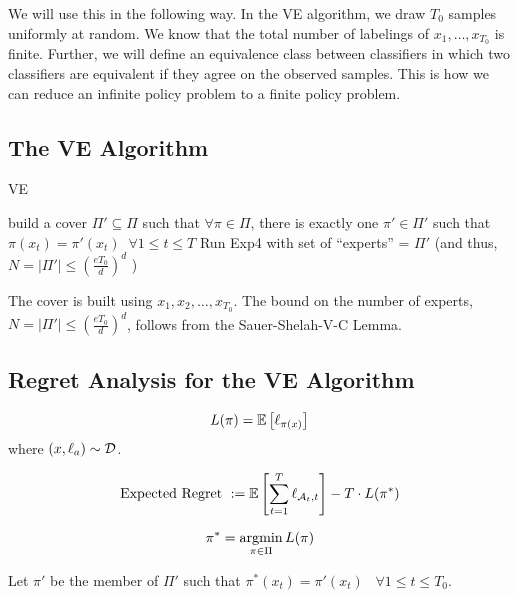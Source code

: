 \documentclass[11pt]{article}
\begin{document}
We will use this in the following way. In the VE algorithm, we draw $T_0$ samples uniformly at random. We know that the total number of labelings of $x_1,\ldots,x_{T_0}$ is finite. Further, we will define an equivalence class between classifiers in which two classifiers are equivalent if they agree on the observed samples. This is how we can reduce an infinite policy problem to a finite policy problem. 


\subsection{The VE Algorithm}

\begin{algorithm}
\caption{VE}
\label{alg: VE}
\begin{algorithmic}
\ENDFOR
\STATE build a cover  $\Pi' \subseteq \Pi$ such that $\forall \pi \in \Pi$, there is exactly one $\pi' \in \Pi'$ such that $\pi(x_t) = \pi'(x_t)\;\;\forall 1 \le t \le T$
\STATE Run Exp4 with set of ``experts'' = $\Pi'$ (and thus,  $N = |\Pi'| \le (\frac{eT_0}{d})^d$ )
\ENDFOR
\end{algorithmic}
\end{algorithm}
The cover is built using $x_1,x_2,\ldots,x_{T_0}$. The bound on the number of experts, $N= |\Pi'| \le (\frac{eT_0}{d})^d$, follows from the Sauer-Shelah-V-C Lemma. 

%
%
\subsection{Regret Analysis for the VE Algorithm}
\begin{equation}
L(\pi) = \mathbb{E}\left[ \ell_{\pi(x)} \right]
\end{equation}
where ${(x,\ell_a)\sim \mathcal{D}}$.

\begin{equation}
\text{Expected Regret }:= \mathbb{E}\left[ \sum_{t=1}^T\ell_{\mathcal{A}_t,t} \right] - T\cdot L(\pi^*)
\end{equation}

$$\pi^*=\operatorname*{argmin}_{\pi\in\Pi} L(\pi)$$

Let $\pi'$ be the member of $\Pi'$ such that $\pi^*(x_t) = \pi'(x_t)\;\;\;\forall 1\le t \le T_0$.
\end{document}
